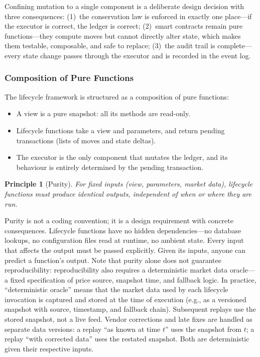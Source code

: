\documentclass[11pt,a4paper]{article}
\newtheorem{principle}[definition]{Principle}
\begin{document}
Confining mutation to a single component is a deliberate design decision with three consequences: (1)~the conservation law is enforced in exactly one place---if the executor is correct, the ledger is correct; (2)~smart contracts remain pure functions---they compute moves but cannot directly alter state, which makes them testable, composable, and safe to replace; (3)~the audit trail is complete---every state change passes through the executor and is recorded in the event log.

\subsubsection{Composition of Pure Functions}

The lifecycle framework is structured as a composition of pure functions:
\begin{itemize}[nosep]
\item A view is a pure snapshot: all its methods are read-only.
\item Lifecycle functions take a view and parameters, and return pending transactions (lists of moves and state deltas).
\item The executor is the only component that mutates the ledger, and its behaviour is entirely determined by the pending transaction.
\end{itemize}

\begin{principle}[Purity]
For fixed inputs (view, parameters, market data), lifecycle functions must produce identical outputs, independent of when or where they are run.
\end{principle}

\noindent Purity is not a coding convention; it is a design requirement with concrete consequences. Lifecycle functions have no hidden dependencies---no database lookups, no configuration files read at runtime, no ambient state. Every input that affects the output must be passed explicitly. Given its inputs, anyone can predict a function's output. Note that purity alone does not guarantee reproducibility: reproducibility also requires a deterministic market data oracle---a fixed specification of price source, snapshot time, and fallback logic. In practice, ``deterministic oracle'' means that the market data used by each lifecycle invocation is captured and stored at the time of execution (e.g., as a versioned snapshot with source, timestamp, and fallback chain). Subsequent replays use the stored snapshot, not a live feed. Vendor corrections and late fixes are handled as separate data versions: a replay ``as known at time $t$'' uses the snapshot from $t$; a replay ``with corrected data'' uses the restated snapshot. Both are deterministic given their respective inputs.
\end{document}

